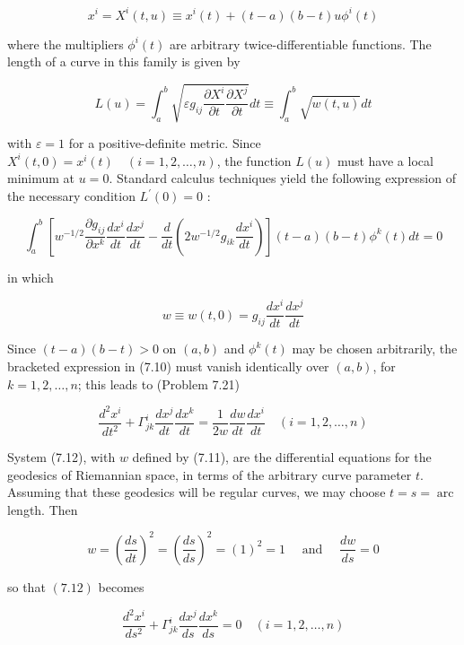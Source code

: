 \documentclass[10pt]{article}
\begin{document}
$$
x^{i}=X^{i}(t, u) \equiv x^{i}(t)+(t-a)(b-t) u \phi^{i}(t)
$$

where the multipliers $\phi^{i}(t)$ are arbitrary twice-differentiable functions. The length of a curve in this family is given by

$$
L(u)=\int_{a}^{b} \sqrt{\varepsilon g_{i j} \frac{\partial X^{i}}{\partial t} \frac{\partial X^{j}}{\partial t}} d t \equiv \int_{a}^{b} \sqrt{w(t, u)} d t
$$

with $\varepsilon=1$ for a positive-definite metric. Since $X^{i}(t, 0)=x^{i}(t) \quad(i=1,2, \ldots, n)$, the function $L(u)$ must have a local minimum at $u=0$. Standard calculus techniques yield the following expression of the necessary condition $L^{\prime}(0)=0$ :


\begin{equation*}
\int_{a}^{b}\left[w^{-1 / 2} \frac{\partial g_{i j}}{\partial x^{k}} \frac{d x^{i}}{d t} \frac{d x^{j}}{d t}-\frac{d}{d t}\left(2 w^{-1 / 2} g_{i k} \frac{d x^{i}}{d t}\right)\right](t-a)(b-t) \phi^{k}(t) d t=0 \tag{7.10}
\end{equation*}


in which


\begin{equation*}
w \equiv w(t, 0)=g_{i j} \frac{d x^{i}}{d t} \frac{d x^{j}}{d t} \tag{7.11}
\end{equation*}


Since $(t-a)(b-t)>0$ on $(a, b)$ and $\phi^{k}(t)$ may be chosen arbitrarily, the bracketed expression in (7.10) must vanish identically over $(a, b)$, for $k=1,2, \ldots, n$; this leads to (Problem 7.21)


\begin{equation*}
\frac{d^{2} x^{i}}{d t^{2}}+\Gamma_{j k}^{i} \frac{d x^{j}}{d t} \frac{d x^{k}}{d t}=\frac{1}{2 w} \frac{d w}{d t} \frac{d x^{i}}{d t} \quad(i=1,2, \ldots, n) \tag{7.12}
\end{equation*}


System (7.12), with $w$ defined by (7.11), are the differential equations for the geodesics of Riemannian space, in terms of the arbitrary curve parameter $t$. Assuming that these geodesics will be regular curves, we may choose $t=s=\operatorname{arc}$ length. Then

$$
w=\left(\frac{d s}{d t}\right)^{2}=\left(\frac{d s}{d s}\right)^{2}=(1)^{2}=1 \quad \text { and } \quad \frac{d w}{d s}=0
$$

so that $(7.12)$ becomes


\begin{equation*}
\frac{d^{2} x^{i}}{d s^{2}}+\Gamma_{j k}^{i} \frac{d x^{j}}{d s} \frac{d x^{k}}{d s}=0 \quad(i=1,2, \ldots, n) \tag{7.13}
\end{equation*}
\end{document}
